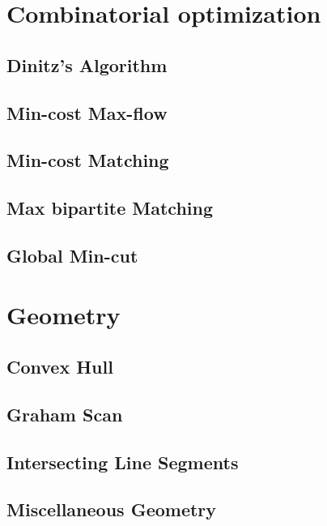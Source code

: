 \section{Combinatorial optimization}
\subsection{Dinitz's Algorithm}
\raggedbottom
\hrulefill
\subsection{Min-cost Max-flow}
\raggedbottom
\hrulefill
\subsection{Min-cost Matching}
\raggedbottom
\hrulefill
\subsection{Max bipartite Matching}
\raggedbottom
\hrulefill
\subsection{Global Min-cut}
\raggedbottom
\hrulefill

\section{Geometry}
\subsection{Convex Hull}
\raggedbottom
\hrulefill
\subsection{Graham Scan}
\raggedbottom
\hrulefill
\subsection{Intersecting Line Segments}
\raggedbottom
\hrulefill
\subsection{Miscellaneous Geometry}
\raggedbottom
\hrulefill

